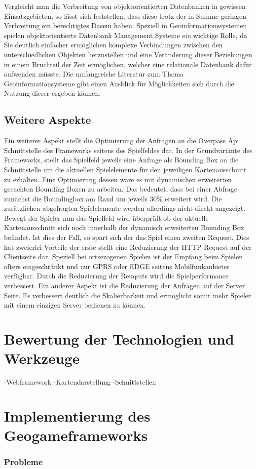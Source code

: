 Vergleicht man die Verbreitung von objektorientierten Datenbanken in gewissen Einsatzgebieten, so lässt sich feststellen, dass diese trotz der in Summe geringen Verbreitung ein berechtigtes Dasein haben. Speziell in Geoinformationssystemen spielen objektorientierte Datenbank Management Systeme ein wichtige Rolle,\cite{Brinkhoff.2005} da Sie deutlich einfacher ermöglichen komplexe Verbindungen zwischen den unterschiedlichen Objekten herzustellen und eine Veränderung dieser Beziehungen in einem Bruchteil der Zeit ermöglichen, welcher eine relationale Datenbank dafür aufwenden müsste. Die umfangreiche Literatur zum Thema Geoinformationsysteme gibt einen Ausblick für Möglichkeiten sich durch die Nutzung dieser ergeben können.

\subsection*{Weitere Aspekte}

Ein weiterer Aspekt stellt die Optimierung der Anfragen an die Overpass Api Schnittstelle des Frameworks seitens des Spielfeldes dar. In der Grundvariante des Frameworks, stellt das Spielfeld jeweils eine Anfrage als Bounding Box an die Schnittstelle um die aktuellen Spielelemente für den jeweiligen Kartenausschnitt zu erhalten. Eine Optimierung dessen wäre es mit dynamischen erweiterten gecachten Bounding Boxen zu arbeiten. Das bedeutet, dass bei einer Abfrage zunächst die Boundingbox am Rand um jeweils 30\% erweitert wird. Die zusätzlichen abgefragten Spielelemente werden allerdings nicht direkt angezeigt. Bewegt der Spieler nun das Spielfeld wird überprüft ob der aktuelle Kartenausschnitt sich noch innerhalb der dynamisch erweiterten Bounding Box befindet. Ist dies der Fall, so spart sich der das Spiel einen zweiten Request. Dies hat zweierlei Vorteile der erste stellt eine Reduzierung der HTTP Request auf der Clientseite dar. Speziell bei ortsezogenen Spielen ist der Empfang beim Spielen öfters eingeschränkt und nur GPRS oder EDGE seitens Mobilfunkanbieter verfügbar. Durch die Reduzierung der Reuqests wird die Spielperformance verbessert. Ein anderer Aspekt ist die Reduzierung der Anfragen auf der Server Seite. Es verbessert deutlich die Skalierbarkeit und ermöglicht somit mehr Spieler mit einem einzigen Server bedienen zu können.


\section{Bewertung der Technologien und Werkzeuge}

-Webframework
-Kartendarstellung
-Schnittstellen

\section{Implementierung des Geogameframeworks}



\subsubsection*{Probleme}